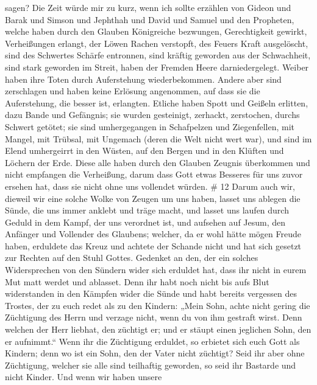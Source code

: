 sagen? Die Zeit würde mir zu kurz, wenn ich sollte erzählen von Gideon
und Barak und Simson und Jephthah und David und Samuel und den
Propheten,  welche haben durch den Glauben Königreiche
bezwungen, Gerechtigkeit gewirkt, Verheißungen erlangt, der Löwen Rachen
verstopft,  des Feuers Kraft ausgelöscht, sind des
Schwertes Schärfe entronnen, sind kräftig geworden aus der Schwachheit,
sind stark geworden im Streit, haben der Fremden Heere darniedergelegt.
 Weiber haben ihre Toten durch Auferstehung wiederbekommen.
Andere aber sind zerschlagen und haben keine Erlösung angenommen, auf
dass sie die Auferstehung, die besser ist, erlangten. 
Etliche haben Spott und Geißeln erlitten, dazu Bande und Gefängnis;
 sie wurden gesteinigt, zerhackt, zerstochen, durchs
Schwert getötet; sie sind umhergegangen in Schafpelzen und Ziegenfellen,
mit Mangel, mit Trübsal, mit Ungemach  (deren die Welt
nicht wert war), und sind im Elend umhergeirrt in den Wüsten, auf den
Bergen und in den Klüften und Löchern der Erde.  Diese alle
haben durch den Glauben Zeugnis überkommen und nicht empfangen die
Verheißung,  darum dass Gott etwas Besseres für uns zuvor
ersehen hat, dass sie nicht ohne uns vollendet würden. \# 12
 Darum auch wir, dieweil wir eine solche Wolke von Zeugen um
uns haben, lasset uns ablegen die Sünde, die uns immer anklebt und träge
macht, und lasset uns laufen durch Geduld in dem Kampf, der uns
verordnet ist,  und aufsehen auf Jesum, den Anfänger und
Vollender des Glaubens; welcher, da er wohl hätte mögen Freude haben,
erduldete das Kreuz und achtete der Schande nicht und hat sich gesetzt
zur Rechten auf den Stuhl Gottes.  Gedenket an den, der ein
solches Widersprechen von den Sündern wider sich erduldet hat, dass ihr
nicht in eurem Mut matt werdet und ablasset.  Denn ihr habt
noch nicht bis aufs Blut widerstanden in den Kämpfen wider die Sünde
 und habt bereits vergessen des Trostes, der zu euch redet
als zu den Kindern: „Mein Sohn, achte nicht gering die Züchtigung des
Herrn und verzage nicht, wenn du von ihm gestraft wirst. 
Denn welchen der Herr liebhat, den züchtigt er; und er stäupt einen
jeglichen Sohn, den er aufnimmt.``  Wenn ihr die Züchtigung
erduldet, so erbietet sich euch Gott als Kindern; denn wo ist ein Sohn,
den der Vater nicht züchtigt?  Seid ihr aber ohne
Züchtigung, welcher sie alle sind teilhaftig geworden, so seid ihr
Bastarde und nicht Kinder.  Und wenn wir haben unsere
